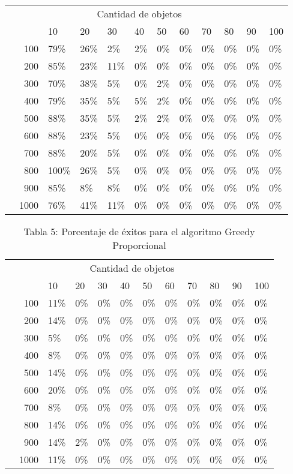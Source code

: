 \documentclass{article}
\begin{document}
\begin{center}
\begin{table}[ht]
\begin{tabularx}{0.8\textwidth}{Xr|XXXXXXXXXX}
&\multicolumn{10}{c}{Cantidad de objetos} \\
&&10&20&30&40&50&60&70&80&90&100\\\hline
\parbox[t]{2mm}{}&100&79\%&26\%&2\%&2\%&0\%&0\%&0\%&0\%&0\%&0\%\\
&200&85\%&23\%&11\%&0\%&0\%&0\%&0\%&0\%&0\%&0\%\\
&300&70\%&38\%&5\%&0\%&2\%&0\%&0\%&0\%&0\%&0\%\\
&400&79\%&35\%&5\%&5\%&2\%&0\%&0\%&0\%&0\%&0\%\\
&500&88\%&35\%&5\%&2\%&2\%&0\%&0\%&0\%&0\%&0\%\\
&600&88\%&23\%&5\%&0\%&0\%&0\%&0\%&0\%&0\%&0\%\\
&700&88\%&20\%&5\%&0\%&0\%&0\%&0\%&0\%&0\%&0\%\\
&800&100\%&26\%&5\%&0\%&0\%&0\%&0\%&0\%&0\%&0\%\\
&900&85\%&8\%&8\%&0\%&0\%&0\%&0\%&0\%&0\%&0\%\\
&1000&76\%&41\%&11\%&0\%&0\%&0\%&0\%&0\%&0\%&0\%\\
\end{tabularx}
\end{table}
\begin{table}[ht]
\centering
\caption*{Tabla 5: Porcentaje de éxitos para el algoritmo Greedy Proporcional}
\label{5}
\begin{tabularx}{0.8\textwidth}{Xr|XXXXXXXXXX}
&\multicolumn{10}{c}{Cantidad de objetos} \\
&&10&20&30&40&50&60&70&80&90&100\\\hline
\parbox[t]{2mm}{}&100&11\%&0\%&0\%&0\%&0\%&0\%&0\%&0\%&0\%&0\%\\
&200&14\%&0\%&0\%&0\%&0\%&0\%&0\%&0\%&0\%&0\%\\
&300&5\%&0\%&0\%&0\%&0\%&0\%&0\%&0\%&0\%&0\%\\
&400&8\%&0\%&0\%&0\%&0\%&0\%&0\%&0\%&0\%&0\%\\
&500&14\%&0\%&0\%&0\%&0\%&0\%&0\%&0\%&0\%&0\%\\
&600&20\%&0\%&0\%&0\%&0\%&0\%&0\%&0\%&0\%&0\%\\
&700&8\%&0\%&0\%&0\%&0\%&0\%&0\%&0\%&0\%&0\%\\
&800&14\%&0\%&0\%&0\%&0\%&0\%&0\%&0\%&0\%&0\%\\
&900&14\%&2\%&0\%&0\%&0\%&0\%&0\%&0\%&0\%&0\%\\
&1000&11\%&0\%&0\%&0\%&0\%&0\%&0\%&0\%&0\%&0\%\\
\end{tabularx}
\end{table}
\end{center}
\end{document}
